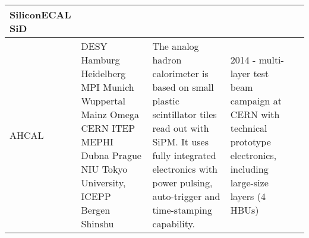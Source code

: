 \begin{landscape}
\begin{sidewaystable}
\begin{adjustbox}{max width=1.1\textwidth,totalheight=1\textheight}
\begin{tabularx}{2\textheight}{lXXXX}
    \midrule
    SiliconECAL SiD                                                                                                &                                                                                                                                         &                                                                                                                                                                                                                                                                                                                                                                                      &                                                                                                                                                                                                                                                                 &                                                                                                                                                                                                                                     \\
    \midrule
    AHCAL &
    DESY\newline
    Hamburg\newline
    Heidelberg\newline
    MPI Munich \newline
    Wuppertal\newline
    Mainz\newline
    Omega\newline
    CERN\newline
    ITEP\newline
    MEPHI\newline
    Dubna\newline
    Prague\newline
    NIU\newline
    Tokyo University, ICEPP\newline
    Bergen\newline
    Shinshu &
     The analog hadron calorimeter is based on small plastic scintillator tiles read out with SiPM. It uses fully integrated electronics with power pulsing, auto-trigger and time-stamping capability.                                                                                                                                                                                   &
     2014 - multi-layer test beam campaign at CERN with technical prototype electronics, including large-size layers (4 HBUs)\newline

\end{tabularx}
\end{adjustbox}
\end{sidewaystable}
\end{landscape}

